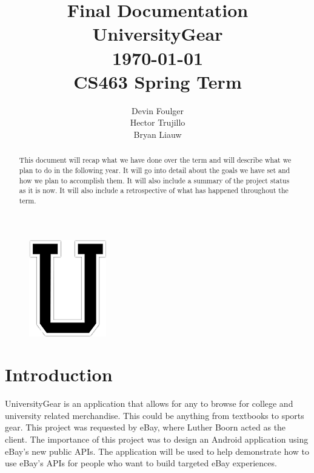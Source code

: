 \documentclass[journal,compsoc, 10pt, draftclsnofoot, onecolumn]{IEEEtran}
\begin{document}
\title{\vspace{20em}Final Documentation \\{\vspace{-1ex}\huge UniversityGear} \\ {\large
\today \\ CS463 Spring Term}}
\author{\vspace{10ex}Devin Foulger \\{\vspace{-1ex}Hector Trujillo} \\{\vspace{-1ex}Bryan
Liauw}}

\begin{titlepage}

\maketitle
\thispagestyle{empty}

\begin{figure}[!h]

\centering
\includegraphics[scale=.6]{ugear_launcher}
\end{figure}
\FloatBarrier

\begin{abstract}
This document will recap what we have done over the term and will describe what we plan to do
in the following year. It will go
into detail about the goals we have set and how we plan to accomplish them. It will also
include a summary of the project status as it
is now. It will also include a retrospective of what has happened throughout the term.
\end{abstract}

\end{titlepage}

\tableofcontents

\section{Introduction}
UniversityGear is an application that allows for any to browse for college and 
university related merchandise. This could be anything from textbooks to sports 
gear. This project was requested by eBay, where Luther Boorn acted as the client. 
The importance of this project was to design an Android application using eBay's 
new public APIs. The application will be used to help demonstrate how to use 
eBay's APIs for people who want to build targeted eBay experiences. \newline
\end{document}
